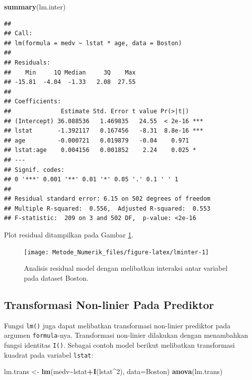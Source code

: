 \documentclass[
]{book}
\newenvironment{Shaded}{\begin{snugshade}}{\end{snugshade}}
\newcommand{\AttributeTok}[1]{\textcolor[rgb]{0.13,0.29,0.53}{#1}}
\newcommand{\DecValTok}[1]{\textcolor[rgb]{0.00,0.00,0.81}{#1}}
\newcommand{\FunctionTok}[1]{\textcolor[rgb]{0.13,0.29,0.53}{\textbf{#1}}}
\newcommand{\NormalTok}[1]{#1}
\newcommand{\OtherTok}[1]{\textcolor[rgb]{0.56,0.35,0.01}{#1}}
\newcommand{\SpecialCharTok}[1]{\textcolor[rgb]{0.81,0.36,0.00}{\textbf{#1}}}
\theoremstyle{definition}
\theoremstyle{definition}
\theoremstyle{definition}
\theoremstyle{definition}
\theoremstyle{remark}
\begin{document}
\begin{Shaded}
\begin{Highlighting}[]
\FunctionTok{summary}\NormalTok{(lm.inter)}
\end{Highlighting}
\end{Shaded}

\begin{verbatim}
## 
## Call:
## lm(formula = medv ~ lstat * age, data = Boston)
## 
## Residuals:
##    Min     1Q Median     3Q    Max 
## -15.81  -4.04  -1.33   2.08  27.55 
## 
## Coefficients:
##              Estimate Std. Error t value Pr(>|t|)    
## (Intercept) 36.088536   1.469835   24.55  < 2e-16 ***
## lstat       -1.392117   0.167456   -8.31  8.8e-16 ***
## age         -0.000721   0.019879   -0.04    0.971    
## lstat:age    0.004156   0.001852    2.24    0.025 *  
## ---
## Signif. codes:  
## 0 '***' 0.001 '**' 0.01 '*' 0.05 '.' 0.1 ' ' 1
## 
## Residual standard error: 6.15 on 502 degrees of freedom
## Multiple R-squared:  0.556,  Adjusted R-squared:  0.553 
## F-statistic:  209 on 3 and 502 DF,  p-value: <2e-16
\end{verbatim}

Plot residual ditampilkan pada Gambar \ref{fig:lminter}.

\begin{figure}

{\centering \texttt{[image: Metode\_Numerik\_files/figure-latex/lminter-1]} 

}

\caption{Analisis residual model dengan melibatkan interaksi antar variabel pada dataset Boston.}\label{fig:lminter}
\end{figure}

\hypertarget{nlinpred}{%
\subsection{Transformasi Non-linier Pada Prediktor}\label{nlinpred}}

Fungsi \texttt{lm()} juga dapat melibatkan transformasi non-linier prediktor pada argumen \texttt{formula}-nya. Transformasi non-linier dilakukan dengan menambahkan fungsi identitas \texttt{I()}. Sebagai contoh model berikut melibatkan transformasi kuadrat pada variabel \texttt{lstat}:

\begin{Shaded}
\begin{Highlighting}[]
\NormalTok{lm.trans }\OtherTok{\textless{}{-}} \FunctionTok{lm}\NormalTok{(medv}\SpecialCharTok{\textasciitilde{}}\NormalTok{lstat}\SpecialCharTok{+}\FunctionTok{I}\NormalTok{(lstat}\SpecialCharTok{\^{}}\DecValTok{2}\NormalTok{), }\AttributeTok{data=}\NormalTok{Boston)}
\FunctionTok{anova}\NormalTok{(lm.trans)}
\end{Highlighting}
\end{Shaded}
\end{document}
